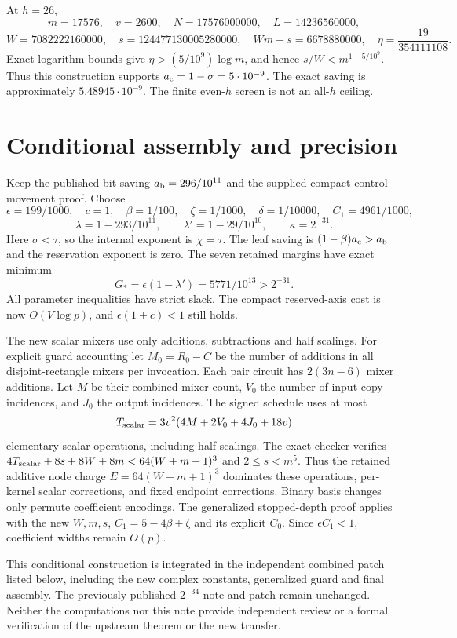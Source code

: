 At $h=26$,
\[
 m=17576,\quad v=2600,\quad N=17576000000,\quad L=14236560000,
\]
\[
 W=7082222160000,\quad s=124477130005280000,
 \quad Wm-s=6678880000,\quad \eta=\frac{19}{354111108}.
\]
Exact logarithm bounds give $\eta>(5/10^9)\log m$, and hence
$s/W<m^{1-5/10^9}$. Thus this construction supports
$a_{\rm c}=1-\sigma=5\cdot10^{-9}$. The exact saving is approximately
$5.48945\cdot10^{-9}$. The finite even-$h$ screen is not an all-$h$ ceiling.

\section{Conditional assembly and precision}
Keep the published bit saving $a_{\rm b}=296/10^{11}$ and the supplied
compact-control movement proof. Choose
\[
 \epsilon=199/1000,\quad c=1,\quad\beta=1/100,\quad
 \zeta=1/1000,\quad\delta=1/10000,\quad C_1=4961/1000,
\]
\[
 \lambda=1-293/10^{11},\qquad\lambda'=1-29/10^{10},\qquad
 \kappa=2^{-31}.
\]
Here $\sigma<\tau$, so the internal exponent is $\chi=\tau$.
The leaf saving is $(1-\beta)a_{\rm c}>a_{\rm b}$ and the reservation
exponent is zero. The seven retained margins have exact minimum
\[
 G_*=\epsilon(1-\lambda')=5771/10^{13}>2^{-31}.
\]
All parameter inequalities have strict slack. The compact reserved-axis
cost is now $O(V\log p)$, and $\epsilon(1+c)<1$ still holds.

The new scalar mixers use only additions, subtractions and half scalings.
For explicit guard accounting let $M_0=R_0-C$ be the number of additions
in all disjoint-rectangle mixers per invocation. Each pair circuit has
$2(3n-6)$ mixer additions. Let $M$ be their combined mixer count, $V_0$
the number of input-copy incidences, and $J_0$ the output incidences.
The signed schedule uses at most
\[
 T_{\rm scalar}=3v^2(4M+2V_0+4J_0+18v)
\]
elementary scalar operations, including half scalings. The exact checker
verifies $4T_{\rm scalar}+8s+8W+8m<64(W+m+1)^3$ and $2\le s<m^5$.
Thus the retained additive node charge $E=64(W+m+1)^3$ dominates these
operations, per-kernel scalar corrections, and fixed endpoint corrections.
Binary basis changes only
permute coefficient encodings. The generalized stopped-depth proof applies
with the new $W,m,s$, $C_1=5-4\beta+\zeta$ and its explicit $C_0$.
Since $\epsilon C_1<1$, coefficient widths remain $O(p)$.

This conditional construction is integrated in the independent combined
patch listed below, including the new complex
constants, generalized guard and final assembly. The previously published
$2^{-34}$ note and patch remain unchanged.
Neither the computations nor this note provide independent review or a
formal verification of the upstream theorem or the new transfer.
